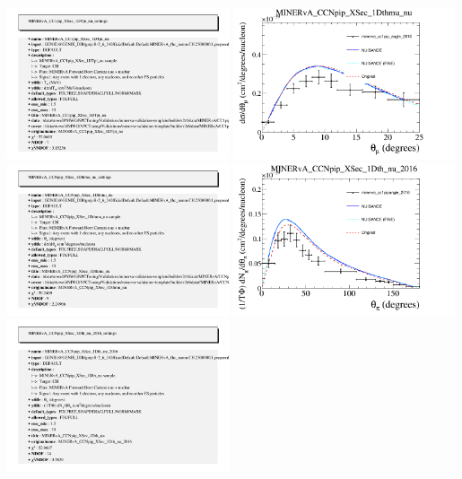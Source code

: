 \documentclass{article}
\begin{document}
\includegraphics[width=0.49\textwidth]{figures/minerva_cc1piptpi_eberly_info.png}
\centering
\includegraphics[width=0.49\textwidth]{figures/minerva_cc1pip_angle_2016_comp.png}
\includegraphics[width=0.49\textwidth]{figures/minerva_cc1pip_angle_2016_info.png}
\centering
\includegraphics[width=0.49\textwidth]{figures/minerva_cc1pipangle_2016_comp.png}
\includegraphics[width=0.49\textwidth]{figures/minerva_cc1pipangle_2016_info.png}
\end{document}
